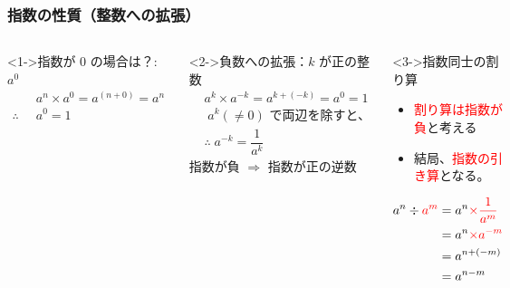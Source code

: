 \documentclass[unicode,12pt,aspectratio=169]{beamer}
\begin{document}
\begin{frame}
	\frametitle{指数の性質（整数への拡張）}
	\begin{columns}[T, onlytextwidth]
			\begin{block}<1->{指数が 0 の場合は？: $a^0$}
				\vspace{-5mm}
				\begin{align*}
				&a^n \times a^0 =a^{(n+0)} = a^n \\
				\therefore \;\;&a^0 = 1
				\end{align*}
			\end{block}
			\begin{block}<2->{負数への拡張：$k$ が正の整数}
				\vspace{-5mm}
				\begin{align*}
					&a^k \times a^{-k} = a^{k+(-k)}=a^0=1 \\
					&\; \text{$a^k (\ne 0)$ で両辺を除すと、} \\
					&\therefore \; a^{-k} = \dfrac{1}{a^k}
				\end{align*}
				\alert{指数が負 $\Rightarrow$ 指数が正の逆数}
			\end{block}
		\begin{alertblock}<3->{指数同士の割り算}
			\begin{itemize}
				\item \textcolor{red}{割り算は指数が負}と考える
				\item 結局、\textcolor{red}{指数の引き算}となる。
			\end{itemize}
			\vspace{-3mm}
			\begin{align*}
				{a^n}\divisionsymbol{\textcolor{red}{a^m}}
					&=a^n \textcolor{red}{\times \dfrac{1}{a^m}} \\
					&= a^n \textcolor{red}{\times a^{-m}} \\
					&= a^{n + (-m)}\\
					&= a^{n-m}
			\end{align*}
		\end{alertblock}
	\end{columns}	
\end{frame}
\end{document}
